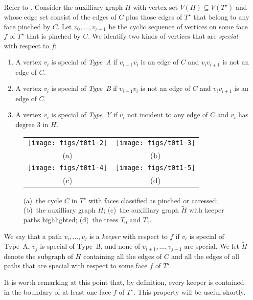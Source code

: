 \documentclass{patmorin}
\newcommand{\dual}[1]{{#1}^\star}
\begin{document}
Refer to . Consider the auxilliary
graph $H$ with vertex set $V(H)\subseteq V(\dual{T})$ and whose edge set
consist of the edges of $C$ plus those edges of $\dual{T}$ that belong
to any face pinched by $C$. Let $v_0,\ldots,v_{r-1}$ be the cyclic sequence of vertices on some face $f$ of $\dual{T}$ that is pinched by $C$.  
We identify two kinds of vertices that are \emph{special} with respect to $f$:
\begin{enumerate}
  \item A vertex $v_i$ is special of \emph{Type~A} if $v_{i-1}v_i$ is an edge of $C$ and $v_iv_{i+1}$ is not an edge of $C$.
  \item A vertex $v_i$ is special of \emph{Type~B} if $v_{i-1}v_i$ is not an edge of $C$ and $v_iv_{i+1}$ is an edge of $C$.
  \item A vertex $v_i$ is special of \emph{Type~Y} if $v_i$ not incident to any edge of $C$ and $v_i$ has degree 3 in $H$.
\end{enumerate}

  \begin{figure}
     \begin{center}\begin{tabular}{cc}
		\texttt{[image: figs/t0t1-2]} &
		\texttt{[image: figs/t0t1-3]} \\
                (a) & (b) \\[1em]
		\texttt{[image: figs/t0t1-4]} & 
		\texttt{[image: figs/t0t1-5]} \\
                (c) & (d)
     \end{tabular}\end{center}
	  \caption{(a)~the cycle $C$ in $\dual{T}$ with faces classified as pinched or caressed; (b)~the auxilliary graph $H$; (c)~the auxilliary graph $\tilde{H}$ with keeper paths highlighted; (d)~the trees $T_0$ and $T_1$.}
  \end{figure}


We say that a path $v_i,\ldots,v_j$ is a \emph{keeper} with respect to
$f$ if $v_i$ is special of Type~A, $v_j$ is special of Type~B, and none
of $v_{i+1},\ldots,v_{j-1}$ are special.  We let $\tilde{H}$ denote the
subgraph of $H$ containing all the edges of $C$ and all the edges of
all paths that are special with respect to some face $f$ of $\dual{T}$.

It is worth remarking at this point that, by definition, every keeper
is contained in the boundary of at least one face $f$ of $\dual{T}$.
This property will be useful shortly.
\end{document}
